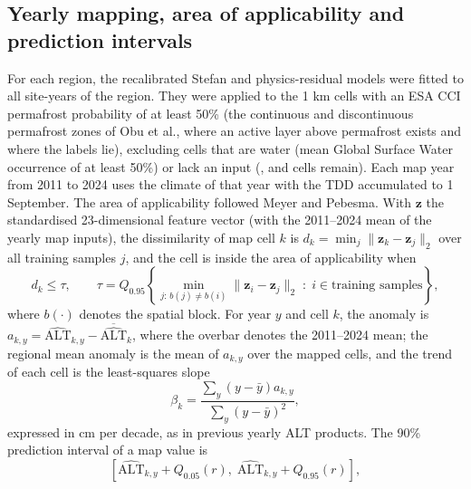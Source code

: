 \subsection{Yearly mapping, area of applicability and prediction intervals}
For each region, the recalibrated Stefan and physics-residual models were fitted to all site-years of the region. They were applied to the 1 km cells with an ESA CCI permafrost probability of at least 50\% (the continuous and discontinuous permafrost zones of Obu et al.\cite{Obu2019}, where an active layer above permafrost exists and where the labels lie), excluding cells that are water (mean Global Surface Water occurrence of at least 50\%) or lack an input (\nncellmapAk{}, \nncellmapLe{} and \nncellmapCa{} cells remain). Each map year from 2011 to 2024 uses the climate of that year with the TDD accumulated to 1 September. The area of applicability followed Meyer and Pebesma\cite{MeyerPebesma2021}. With $\mathbf{z}$ the standardised 23-dimensional feature vector (with the 2011--2024 mean of the yearly map inputs), the dissimilarity of map cell $k$ is $d_k = \min_{j} \lVert \mathbf{z}_k - \mathbf{z}_j \rVert_2$ over all training samples $j$, and the cell is inside the area of applicability when
\begin{equation}
d_k \leq \tau, \qquad \tau = Q_{0.95}\!\left\{ \min_{j:\, b(j) \neq b(i)} \lVert \mathbf{z}_i - \mathbf{z}_j \rVert_2 \;:\; i \in \text{training samples} \right\},
\label{eq:aoa}
\end{equation}
where $b(\cdot)$ denotes the spatial block. For year $y$ and cell $k$, the anomaly is $a_{k,y} = \widehat{\mathrm{ALT}}_{k,y} - \overline{\widehat{\mathrm{ALT}}}_{k}$, where the overbar denotes the 2011--2024 mean; the regional mean anomaly is the mean of $a_{k,y}$ over the mapped cells, and the trend of each cell is the least-squares slope
\begin{equation}
\beta_k = \frac{\sum_{y} \left( y - \bar{y} \right) a_{k,y}}{\sum_{y} \left( y - \bar{y} \right)^{2}},
\label{eq:trend}
\end{equation}
expressed in cm per decade, as in previous yearly ALT products\cite{Liu2024,YiKimball2019}. The 90\% prediction interval of a map value is
\begin{equation}
\left[ \widehat{\mathrm{ALT}}_{k,y} + Q_{0.05}(r),\; \widehat{\mathrm{ALT}}_{k,y} + Q_{0.95}(r) \right],
\label{eq:pi}
\end{equation}
